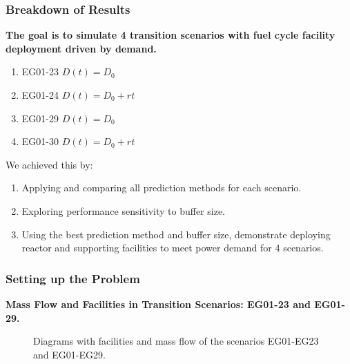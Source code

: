\begin{frame}
    \frametitle{Breakdown of Results}
    \textbf{The goal is to simulate 4 transition scenarios with fuel cycle facility 
    deployment driven by demand.}  
    \begin{enumerate}
        \item EG01-23 $D(t)=D_0$
        \item EG01-24 $D(t)=D_0+rt$
        \item EG01-29 $D(t)=D_0$
        \item EG01-30 $D(t)=D_0+rt$
    \end{enumerate}

We achieved this by:
\begin{enumerate}
    \item Applying and comparing all prediction methods for each scenario. 
    \item Exploring performance sensitivity to buffer size.
    \item Using the best prediction method and buffer size, demonstrate \deploy 
    deploying reactor and supporting facilities to meet power demand 
    for 4 scenarios. 
\end{enumerate}

\end{frame}

\begin{frame}
    \frametitle{Setting up the Problem}
\textbf{Mass Flow and Facilities in Transition Scenarios: EG01-23 and EG01-29.}

    \begin{figure}[]
        \centering
        \hspace{1em}
        \caption{Diagrams with facilities and mass flow of the scenarios EG01-EG23 and EG01-EG29.}
        \label{fig:eg2329}
    \end{figure}
\end{frame}
